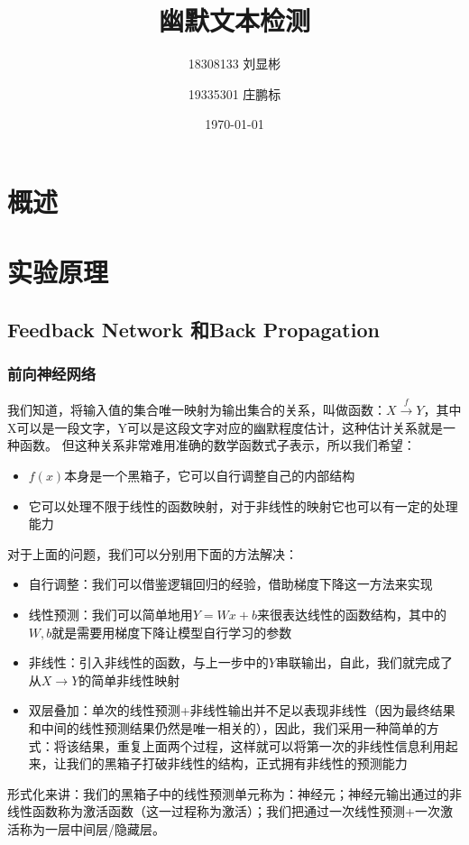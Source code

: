 \documentclass{ctexart}
\title{幽默文本检测}
\author{18308133 刘显彬}
\author{19335301 庄鹏标}
\date{\today}
\begin{document}
    \maketitle
    \tableofcontents
    \section{概述}
    \section{实验原理}
        \subsection{Feedback Network 和Back Propagation}
            \subsubsection{前向神经网络}
                我们知道，将输入值的集合唯一映射为输出集合的关系，叫做函数：$ X \overset{f}{\rightarrow} Y $，其中X可以是一段文字，Y可以是这段文字对应的幽默程度估计，这种估计关系就是一种函数。
                但这种关系非常难用准确的数学函数式子表示，所以我们希望：
                \begin{itemize}
                    \item $f(x)$本身是一个黑箱子，它可以自行调整自己的内部结构
                    \item 它可以处理不限于线性的函数映射，对于非线性的映射它也可以有一定的处理能力
                \end{itemize}
                对于上面的问题，我们可以分别用下面的方法解决：
                \begin{itemize}
                    \item 自行调整：我们可以借鉴逻辑回归的经验，借助梯度下降这一方法来实现
                    \item 线性预测：我们可以简单地用$Y=Wx+b$来很表达线性的函数结构，其中的$W,b$就是需要用梯度下降让模型自行学习的参数
                    \item 非线性：引入非线性的函数，与上一步中的$Y$串联输出，自此，我们就完成了从$X\rightarrow Y$的简单非线性映射
                    \item 双层叠加：单次的线性预测+非线性输出并不足以表现非线性（因为最终结果和中间的线性预测结果仍然是唯一相关的），因此，我们采用一种简单的方式：将该结果，重复上面两个过程，这样就可以将第一次的非线性信息利用起来，让我们的黑箱子打破非线性的结构，正式拥有非线性的预测能力
                \end{itemize}
                形式化来讲：我们的黑箱子中的线性预测单元称为：神经元；神经元输出通过的非线性函数称为激活函数（这一过程称为激活）；我们把通过一次线性预测+一次激活称为一层中间层/隐藏层。
                
\end{document}
